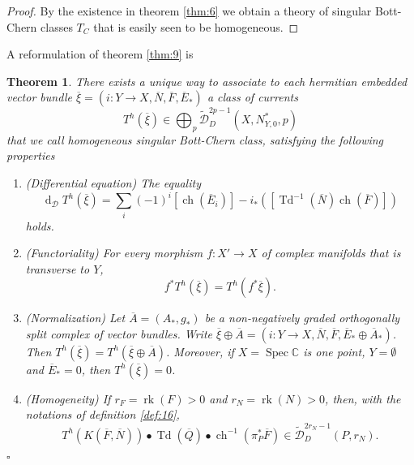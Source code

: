 \documentclass[10pt,twoside]{article}
\numberwithin{equation}{section}
\theoremstyle{plain}
\newtheorem{theorem}[equation]{Theorem}
\theoremstyle{definition}
\DeclareMathOperator{\Td}{Td}
\DeclareMathOperator{\dd}{d}
\DeclareMathOperator{\ch}{ch}
\DeclareMathOperator{\rk}{rk}
\DeclareMathOperator{\Spec}{Spec}
\begin{document}
\begin{proof}
  By the existence in theorem \ref{thm:6} we
  obtain a theory of singular Bott-Chern classes $T_{C}$ that is
  easily seen to be homogeneous. 
\end{proof}

A reformulation of theorem \ref{thm:9} is 
\begin{theorem} \label{thm:12}
  There exists a unique way to associate to each 
  hermitian embedded vector bundle $\overline {\xi}=
  (i\colon Y\longrightarrow 
  X,\overline N, \overline 
  F, \overline E_{\ast}) $ a class of currents 
  \begin{displaymath}
    T^{h}(\overline \xi)\in \bigoplus_{p} \widetilde
     {\mathcal{D}}^{2p-1}_{D}(X,N^{\ast}_{Y,0},p) 
  \end{displaymath}
  that we call homogeneous singular Bott-Chern class,
  satisfying the following properties
  \begin{enumerate}
  \item  (Differential equation) The equality 
    \begin{equation}
      \dd_{\mathcal{D}} T^{h}(\overline \xi)=
      \sum_{i}(-1)^{i}[\ch(\overline
      E_{i})]-i_{\ast}([\Td^{-1}(\overline N)\ch(\overline F)]) 
    \end{equation}
    holds.
  \item (Functoriality) For every morphism
    $f\colon X'\longrightarrow X$ of 
    complex manifolds that is transverse to $Y$, 
    \begin{displaymath}
      f^{\ast} T^{h}(\overline \xi)=T^{h}(f^{\ast} \overline
      \xi). 
    \end{displaymath}
  \item (Normalization)  Let $\overline A=(
    A_{\ast},g_{\ast})$ be a non-negatively graded orthogonally split
    complex of vector 
    bundles. Write $\overline{\xi}\oplus \overline
    A=(i\colon Y\longrightarrow 
    X,\overline N, \overline 
    F, \overline E_{\ast}\oplus \overline A_{\ast})$.
    Then
    $T^{h}(\overline \xi)=T^{h}(\overline \xi\oplus \overline A)$. Moreover,
    if $X=\Spec \mathbb{C}$ is one point, $Y=\emptyset$ and $\overline
    E_{\ast}=0$, then $T^{h}(\overline \xi)=0$.
  \item (Homogeneity) If $r_{F}=\rk(F)>0$ and $r_{N}=\rk(N)>0$, then, with
    the notations of 
    definition \ref{def:16},
    \begin{displaymath}
      T^{h}(K(\overline 
      F,\overline N))\bullet \Td(\overline Q)\bullet\ch^{-1}(\pi
      _{P}^{\ast}\overline F)\in \widetilde
      {\mathcal{D}}^{2r_{N}-1}_{D}(P,r_{N}).
    \end{displaymath}
  \end{enumerate}
\hfill $\square$
\end{theorem}
\end{document}
